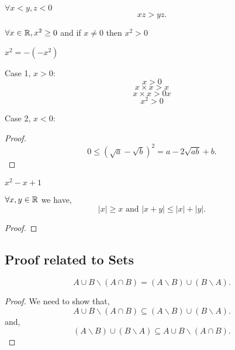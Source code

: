 \begin{theorem}
    $\forall x < y, z < 0$  \[
    xz > yz
    .\] 

    
\end{theorem}

\begin{theorem}
    $\forall x \in \mathbb{R}, x^2 \geq 0$ and if $x \neq 0$ then  $x^2> 0$
\end{theorem}

\begin{theorem}
    $x^2 = - (-x^2)$

    Case 1, $x > 0$: 
    $$x > 0$$
    $$x\times x > x$$
    $$x\times x > 0x$$
    $$ x^2 > 0$$
    
    Case 2, $x < 0$:
\end{theorem}


\begin{proof}
    \[
        0 \leq (\sqrt{a} - \sqrt{b})^2 = a - 2\sqrt{ab} + b
    .\]      
\end{proof}

\begin{eg}
    $x^2 - x + 1$
\end{eg}



\begin{theorem}
    $\forall x,y \in \mathbb{R}$ we have,  \[
        |x| \geq x \text{ and } |x + y| \leq |x| + |y|
    .\] 

\end{theorem}

\begin{proof}
    
\end{proof}


\subsection*{Proof related to Sets}
\begin{theorem}
    \[
    A \cup B \backslash (A \cap B) = (A \backslash B) \cup (B \backslash A)
    .\] 

\end{theorem}

\begin{proof}
    We need to show that, \[
 A \cup B \backslash (A \cap B) \subseteq  (A \backslash B) \cup (B \backslash A)
    .\] 
    and,
  \[
  (A \backslash B) \cup (B \backslash A) \subseteq A \cup B \backslash (A \cap B) 
  .\] 
\end{proof}



